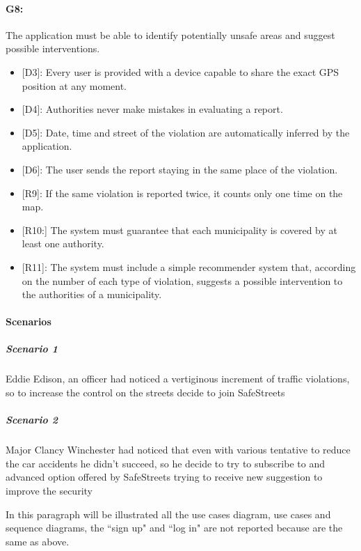 \documentclass[12pt,a4paper]{report}
\begin{document}
			\paragraph {G8:} The application must be able to identify potentially unsafe areas and suggest possible interventions.
				\begin{itemize}
					\item{[D3]:} Every user is provided with a device capable to share the exact GPS position at any moment.
			 		\item{[D4]:} Authorities never make mistakes in evaluating a report.
					\item{[D5]:} Date, time and street of the violation are automatically inferred by the application.
			 		\item{[D6]:} The user sends the report staying in the same place of the violation.
				\end{itemize}
				\begin{itemize}
					\item{[R9]:} If the same violation is reported twice, it counts only one time on the map.
					\item{[R10:]} The system must guarantee that each municipality is covered by at least one authority.
					\item{[R11]:} The system must include a simple recommender system that, according on the number of each type of violation, suggests a possible intervention to the authorities of a municipality.
				\end{itemize}

\paragraph{Scenarios}
				\subparagraph{Scenario 1}
					Eddie Edison, an officer had noticed a vertiginous increment of traffic violations, so to increase the control
					on the streets decide to join SafeStreets
					
				\subparagraph{Scenario 2}
					Major Clancy Winchester had noticed that even with various tentative to reduce the car accidents he didn't
					succeed, so he decide to try to subscribe to and advanced option offered by SafeStreets trying to receive
					new suggestion to improve the security
					
				In this paragraph will be illustrated all the use cases diagram, use cases and sequence diagrams, the ``sign up" and ``log in"
				are not reported because are the same as above.
\end{document}
